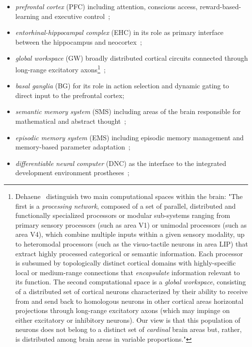 \begin{itemize}
%
\item {\it{prefrontal cortex}} (PFC) including attention, conscious access, reward-based-learning and executive control~\cite{WangetalNATURE-NEUROSCIENCE-18,KrieteetalPNAS-13};
%
\item {\it{entorhinal-hippocampal complex}} (EHC) in its role as primary interface between the hippocampus and neocortex~\cite{OReillyetalCS-15,OReillySCIENCE-06};
%
\item {\it{global workspace}} (GW) broadly distributed cortical circuits connected through long-range excitatory axons\footnote{%
%
    Dehaene~ distinguish two main computational spaces within the brain: "The first is a {\it{processing network}}, composed of a set of parallel, distributed and functionally specialized processors or modular sub-systems ranging from primary sensory processors (such as area V1) or unimodal processors (such as area V4), which combine multiple inputs within a given sensory modality, up to heteromodal processors (such as the visuo-tactile neurons in area LIP) that extract highly processed categorical or semantic information. Each processor is subsumed by topologically distinct cortical domains with highly-specific local or medium-range connections that {\it{encapsulate}} information relevant to its function. The second computational space is a {\it{global workspace}}, consisting of a distributed set of cortical neurons characterized by their ability to receive from and send back to homologous neurons in other cortical areas horizontal projections through long-range excitatory axons (which may impinge on either excitatory or inhibitory neurons). Our view is that this population of neurons does not belong to a distinct set of {\it{cardinal}} brain areas but, rather, is distributed among brain areas in variable proportions."}~\cite{DehaeneetalPNAS-98,Baars1988};
%
\item {\it{basal ganglia}} (BG) for its role in action selection and dynamic gating to direct input to the prefrontal cortex\cite{OReillyetalLEABRA-16,KrieteetalPNAS-13};
% 
\item {\it{semantic memory system}} (SMS) including areas of the brain responsible for mathematical and abstract thought~\cite{Tulving1972,BinderandDesaiTiCS-11};
%
\item {\it{episodic memory system}} (EMS) including episodic memory management and memory-based parameter adaptation~\cite{SprechmannetalICLR-18,PritzeletalICML-17};
%
\item {\it{differentiable neural computer}} (DNC) as the interface to the integrated development environment prostheses~\cite{GravesetalNATURE-16,GravesetalCoRR-14};

\end{itemize}
